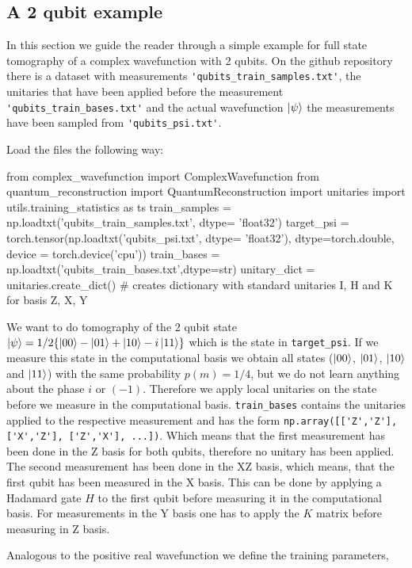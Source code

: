 \documentclass[submission, Phys]{SciPost}
\begin{document}
\subsection{A 2 qubit example}

In this section we guide the reader through a simple example for full state tomography of a complex wavefunction with 2 qubits. On the github repository there is a dataset with measurements \verb|'qubits_train_samples.txt'|, the unitaries that have been applied before the measurement \verb|'qubits_train_bases.txt'| and the actual wavefunction $\ket{\psi}$ the measurements have been sampled from \verb|'qubits_psi.txt'|.

Load the files the following way:

\begin{python}
from complex_wavefunction import ComplexWavefunction
from quantum_reconstruction import QuantumReconstruction
import unitaries
import utils.training_statistics as ts
train_samples = np.loadtxt('qubits_train_samples.txt', dtype= 'float32')
target_psi  = torch.tensor(np.loadtxt('qubits_psi.txt', dtype= 'float32'), dtype=torch.double, device = torch.device('cpu'))
train_bases = np.loadtxt('qubits_train_bases.txt',dtype=str)
unitary_dict = unitaries.create_dict() # creates dictionary with standard unitaries I, H and K for basis Z, X, Y
\end{python}


We want to do tomography of the 2 qubit state $\ket{\psi} = 1/2 \{ \ket{00} - \ket{01} + \ket{10} - i \ket{11} \}$ which is the state in \verb|target_psi|. If we measure this state in the computational basis we obtain all states ($\ket{00}$, $\ket{01}$, $\ket{10}$ and $\ket{11}$) with the same probability $p(m) = 1/4$, but we do not learn anything about the phase $i$ or $(-1)$. Therefore we apply local unitaries on the state before we measure in the computational basis. \verb|train_bases| contains the unitaries applied to the respective measurement and has the form  \verb|np.array([['Z','Z'], ['X','Z'], ['Z','X'], ...])|. Which means that the first measurement has been done in the Z basis for both qubits, therefore no unitary has been applied. The second measurement has been done in the XZ basis, which means, that the first qubit has been measured in the X basis. This can be done by applying a Hadamard gate $H$ to the first qubit before measuring it in the computational basis. For measurements in the Y basis one has to apply the $K$ matrix before measuring in Z basis.

Analogous to the positive real wavefunction we define the training parameters,
\end{document}
